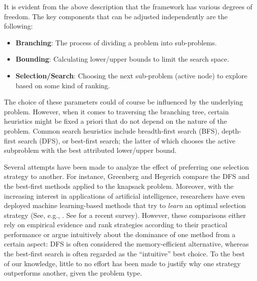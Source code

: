 \documentclass[a4paper,UKenglish,cleveref, autoref, thm-restate, pdfa]{lipics-v2021}
\theoremstyle{plain}
\begin{document}
It is evident from the above description that the framework has various degrees of freedom. The key components that can be adjusted independently are the following:
\begin{itemize}
    \item \textbf{Branching}: The process of dividing a problem into sub-problems.
    \item \textbf{Bounding}: Calculating lower/upper bounds to limit the search space.
    \item \textbf{Selection/Search}: Choosing the next sub-problem (active node) to explore based on some kind of ranking.
\end{itemize}

The choice of these parameters could of course be influenced by the underlying problem. However, when it comes to traversing the branching tree, certain heuristics might be fixed a priori that do not depend on the nature of the problem. Common search heuristics include breadth-first search (BFS), depth-first search (DFS), or best-first search; the latter of which chooses the active subproblem with the best attributed lower/upper bound. 

Several attempts have been made to analyze the effect of preferring one selection strategy to another. For instance, Greenberg and Hegerich \cite{greenberg_hegerich} compare the DFS and the best-first methods applied to the knapsack problem. 
Moreover, with the increasing interest in applications of artificial intelligence, researchers have even deployed machine learning-based methods that try to \emph{learn} an optimal selection strategy (See, e.g., \cite{gp_learning}. See \cite{scavuzzo24} for a recent survey). However, these comparisons either rely on empirical evidence and rank strategies according to their practical performance or argue intuitively about the dominance of one method from a certain aspect: DFS is often considered the memory-efficient alternative, whereas the best-first search is often regarded as the ``intuitive'' best choice. To the best of our knowledge, little to no effort has been made to justify why one strategy outperforms another, given the problem type.
\end{document}

